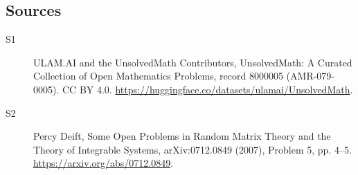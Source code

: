 \documentclass[11pt]{article}
\begin{document}
\subsection{Sources}
\begin{description}
\item[\hypertarget{source:8000005:1}{S1}] ULAM.AI and the UnsolvedMath Contributors, UnsolvedMath: A Curated Collection of Open Mathematics Problems, record 8000005 (AMR-079-0005). CC BY 4.0. \url{https://huggingface.co/datasets/ulamai/UnsolvedMath}.
\item[\hypertarget{source:8000005:2}{S2}] Percy Deift, Some Open Problems in Random Matrix Theory and the Theory of Integrable Systems, arXiv:0712.0849 (2007), Problem 5, pp. 4--5. \url{https://arxiv.org/abs/0712.0849}.
\end{description}
\label{end:8000005}
\end{document}
